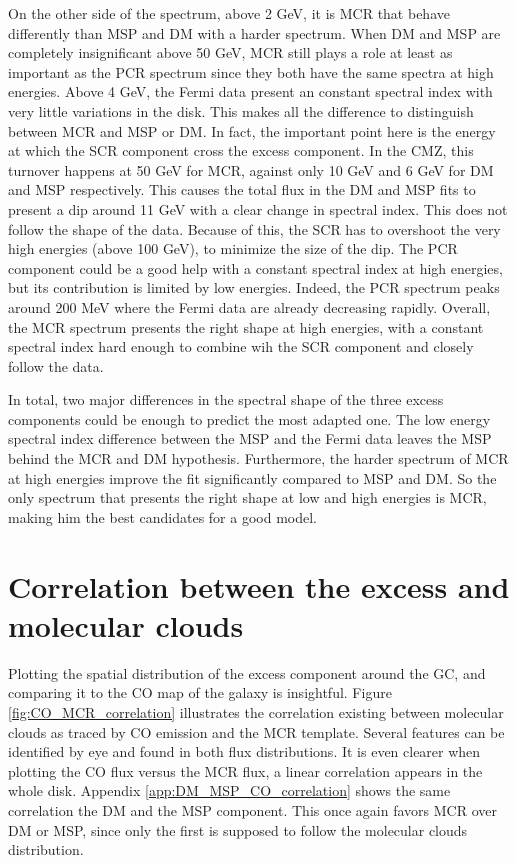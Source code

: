 On the other side of the spectrum, above 2 GeV, it is MCR that behave differently than MSP and DM with a harder spectrum. When DM and MSP are completely insignificant above 50 GeV, MCR still plays a role at least as important as the PCR spectrum since they both have the same spectra at high energies. Above 4 GeV, the Fermi data present an constant spectral index with very little variations in the disk. This makes all the difference to distinguish between MCR and MSP or DM. In fact, the important point here is the energy at which the SCR component cross the excess component. In the CMZ, this turnover happens at 50 GeV for MCR, against only 10 GeV and 6 GeV for DM and MSP respectively. This causes the total flux in the DM and MSP fits to present a dip around 11 GeV with a clear change in spectral index. This does not follow the shape of the data. Because of this, the SCR has to overshoot the very high energies (above 100 GeV), to minimize the size of the dip. The PCR component could be a good help with a constant spectral index at high energies, but its contribution is limited by low energies. Indeed, the PCR spectrum peaks around 200 MeV where the Fermi data are already decreasing rapidly. Overall, the MCR spectrum presents the right shape at high energies, with a constant spectral index hard enough to combine wih the SCR component and closely follow the data.


In total, two major differences in the spectral shape of the three excess components could be enough to predict the most adapted one. The low energy spectral index difference between the MSP and the Fermi data leaves the MSP behind the MCR and DM hypothesis. Furthermore, the harder spectrum of MCR at high energies improve the fit significantly compared to MSP and DM. So the only spectrum that presents the right shape at low and high energies is MCR, making him the best candidates for a good model.

\newpage
\section{Correlation between the excess and molecular clouds}

Plotting the spatial distribution of the excess component around the GC, and comparing it to the CO map of the galaxy is insightful. Figure \ref{fig:CO_MCR_correlation} illustrates the correlation existing between molecular clouds as traced by CO emission and the MCR template. Several features can be identified by eye and found in both flux distributions. It is even clearer when plotting the CO flux versus the MCR flux, a linear correlation appears in the whole disk. Appendix \ref{app:DM_MSP_CO_correlation} shows the same correlation the DM and the MSP component. This once again favors MCR over DM or MSP, since only the first is supposed to follow the molecular clouds distribution.

